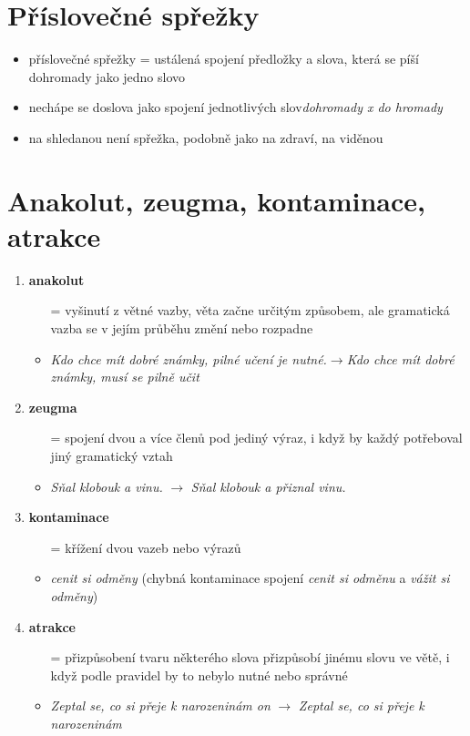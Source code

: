 \documentclass{memoir}
\begin{document}
\section*{Příslovečné spřežky}
	\begin{itemize}
		\item příslovečné spřežky = ustálená spojení předložky a slova, která se píší dohromady jako jedno slovo
		\item nechápe se doslova jako spojení jednotlivých slov\hfill\textit{dohromady x do hromady}
		\item na shledanou není spřežka, podobně jako na zdraví, na viděnou
	\end{itemize}

\section*{Anakolut, zeugma, kontaminace, atrakce}
	\begin{enumerate}
		\item \textbf{anakolut}
		\begin{itemize}
			\item[=] vyšinutí z větné vazby, věta začne určitým způsobem, ale gramatická vazba se v jejím průběhu změní nebo rozpadne
			\item \textit{Kdo chce mít dobré známky, pilné učení je nutné.}$\rightarrow$\textit{Kdo chce mít dobré známky, musí se pilně učit} 
		\end{itemize}
		\item \textbf{zeugma}
		\begin{itemize}
			\item[=] spojení dvou a více členů pod jediný výraz, i když by každý potřeboval jiný gramatický vztah
			\item \textit{Sňal klobouk a vinu.} $\rightarrow$ \textit{Sňal klobouk a přiznal vinu.}
		\end{itemize}
		\item \textbf{kontaminace}
		\begin{itemize}
			\item[=] křížení dvou vazeb nebo výrazů
			\item \textit{cenit si odměny} (chybná kontaminace spojení \textit{cenit si odměnu} a \textit{vážit si odměny})
		\end{itemize}
		\item \textbf{atrakce}
		\begin{itemize}
			\item[=] přizpůsobení tvaru některého slova přizpůsobí jinému slovu ve větě, i když podle pravidel by to nebylo nutné nebo správné
			\item \textit{Zeptal se, co si přeje k narozeninám on} $\rightarrow$ \textit{Zeptal se, co si přeje k narozeninám}
		\end{itemize}
	\end{enumerate}
\end{document}
